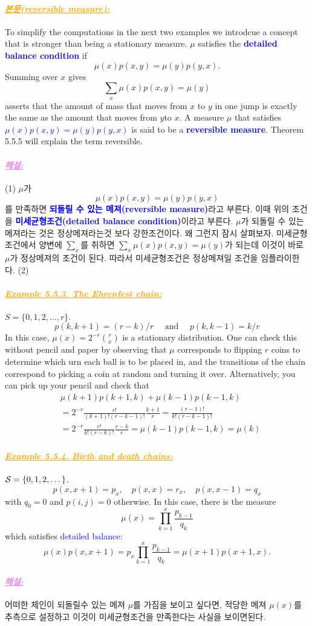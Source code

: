 \documentclass[12pt,oneside,english,a4paper]{article}
\newcommand{\paraviolet}[1]{\paragraph{\LARGE\textcolor{violet}{\it\underline{\textbf{#1:}}}}\LARGE}
\newcommand{\paraorange}[1]{\paragraph{\LARGE\textcolor{orange}{\it\underline{\textbf{#1:}}}}\LARGE}
\begin{document}
\paraorange{본문(reversible measure)} To simplify the computations in the next two examples we introdcue a concept that is stronger than being a stationary measure. $\mu$ satisfies the \textcolor{blue}{\bf detailed balance condition} if
\[
\mu(x)p(x,y) =\mu(y)p(y,x). 
\]
Summing over $x$ gives
\[
\sum_x \mu(x)p(x,y) =\mu(y)
\]
asserts that the amount of mass that moves from $x$ to $y$ in one jump is exactly the same as the amount that moves from $y$to $x$.  A measure $\mu$ that satisfies \textcolor{blue}{$\mu(x)p(x,y) =\mu(y)p(y,x)$} is said to be a \textcolor{blue}{\bf reversible measure}. Theorem 5.5.5 will explain the term reversible.

\paraviolet{해설} (1) $\mu$가 
\[
\mu(x)p(x,y)=\mu(y)p(y,x)
\]
를 만족하면 \textcolor{blue}{\bf 되돌릴 수 있는 메져(reversible measure)}라고 부른다. 이때 위의 조건을 \textcolor{blue}{\bf 미세균형조건(detailed balance condition)}이라고 부른다. $\mu$가 되돌릴 수 있는 메져라는 것은 정상메져라는것 보다 강한조건이다. 왜 그런지 잠시 살펴보자. 미세균형조건에서 양변에 $\sum_x$를 취하면 $\sum_x \mu(x)p(x,y)=\mu(y)$가 되는데 이것이 바로 $\mu$가 정상메져의 조건이 된다. 따라서 미세균형조건은 정상메져일 조건을 임플라이한다. (2) 

\paraorange{Example 5.5.3. The Ehrenfest chain} $S=\{0,1,2,\dots,r\}.$
\[
p(k,k+1)=(r-k)/r \quad \mbox{ and } \quad p(k,k-1)=k/r
\]
In this case, $\mu(x)=2^{-r}\binom{r}{x}$ is a stationary distribution. One can check this without pencil and paper by observing that $\mu$ corresponds to flipping $r$ coins to determine which urn each ball is to be placed in, and the transitions of the chain correspond to picking a coin at random and turning it over. Alternatively, you can pick up your pencil and check that 
\begin{align*}
&\mu(k+1)p(k+1,k)+\mu(k-1)p(k-1,k)\\ 
&=2^{-r}\frac{r!}{(k+1)!(r-k-1)!}\frac{k+1}{r}=\frac{(r-1)!}{k!(r-k-1)!}\\
&=2^{-r}\frac{r!}{k!(r-k)!}\frac{r-k}{r}=\mu(k-1)p(k-1,k)=\mu(k)
\end{align*}

\paraorange{Example 5.5.4. Birth and death chains} ${\cal S}=\{0,1,2,\dots\}$. 
\[
p(x,x+1)=p_x, \quad p(x,x)=r_x, \quad p(x,x-1)=q_x
\]
with $q_0=0$ and $p(i,j)=0$ otherwise. In this case, there is the measure 
\[
\mu(x)=\prod_{k=1}^{x}\frac{p_{k-1}}{q_k}
\]
which satisfies \textcolor{blue}{detailed balance}:
\[
\mu(x)p(x,x+1)=p_x\prod_{k=1}^{x}\frac{p_{k-1}}{q_k}=\mu(x+1)p(x+1,x).
\]

\paraviolet{해설} 어떠한 체인이 되돌릴수 있는 메져 $\mu$를 가짐을 보이고 싶다면, 적당한 메져 $\mu(x)$를 추측으로 설정하고 이것이 미세균형조건을 만족한다는 사실을 보이면된다. 
\end{document}
